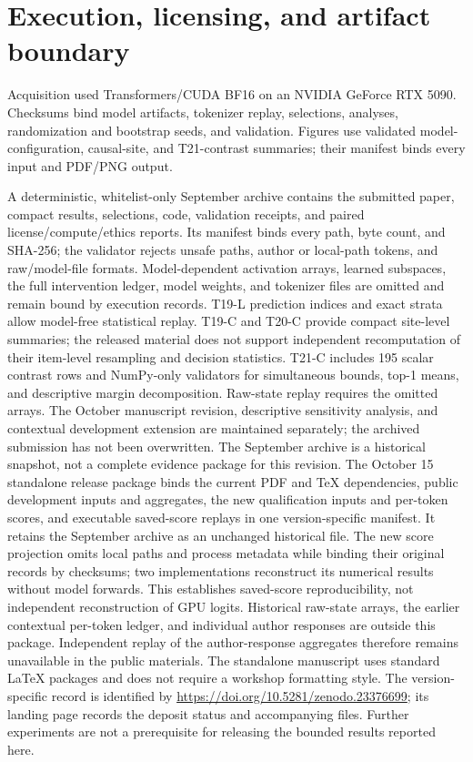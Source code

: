 \documentclass{article}
\begin{document}
\section{Execution, licensing, and artifact boundary}
\label{app:artifact}

Acquisition used Transformers/CUDA BF16 on an NVIDIA GeForce RTX 5090.
Checksums bind model artifacts, tokenizer replay, selections, analyses,
randomization and bootstrap seeds, and validation. Figures use validated
model-configuration, causal-site, and T21-contrast summaries; their manifest
binds every input and PDF/PNG output.

A deterministic, whitelist-only September archive contains the submitted paper, compact results,
selections, code, validation receipts, and paired license/compute/ethics reports.
Its manifest binds every path, byte count, and SHA-256; the validator rejects
unsafe paths, author or local-path tokens, and raw/model-file formats.
Model-dependent activation arrays, learned subspaces, the full intervention
ledger, model weights, and tokenizer files are omitted and remain bound by
execution records. T19-L prediction indices and exact strata allow model-free
statistical replay. T19-C and T20-C provide compact site-level summaries;
the released material does not support independent recomputation of their
item-level resampling and decision statistics. T21-C includes 195 scalar contrast rows and NumPy-only
validators for simultaneous bounds, top-1 means, and descriptive margin
decomposition. Raw-state replay requires the omitted arrays.
The October manuscript revision, descriptive sensitivity analysis, and
contextual development extension are maintained separately; the archived
submission has not been overwritten. The September archive is a historical
snapshot, not a complete evidence package for this revision. The October 15
standalone release package binds the current PDF and TeX dependencies, public
development inputs and aggregates, the new qualification inputs and per-token
scores, and executable saved-score replays in one version-specific manifest.
It retains the September archive as an unchanged historical file. The new
score projection omits local paths and process metadata while binding their
original records by checksums; two implementations reconstruct its numerical
results without model forwards. This establishes saved-score reproducibility,
not independent reconstruction of GPU logits. Historical raw-state arrays,
the earlier contextual per-token ledger, and individual author responses are
outside this package. Independent replay of the author-response aggregates
therefore remains unavailable in the public materials. The standalone manuscript
uses standard LaTeX packages and does not require a workshop formatting style.
The version-specific record is identified by
\url{https://doi.org/10.5281/zenodo.23376699}; its landing page records the
deposit status and accompanying files. Further experiments are not a prerequisite
for releasing the bounded results reported here.
\end{document}
